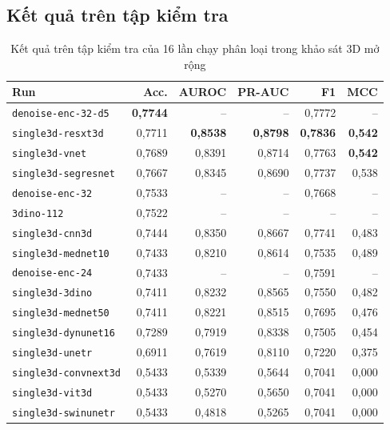 \documentclass[14pt,a4paper,oneside]{extreport}
\begin{document}
\clearpage
\subsection{Kết quả trên tập kiểm tra}
\begin{table}[!htbp]
  \centering
  \caption{Kết quả trên tập kiểm tra của 16 lần chạy phân loại trong khảo sát 3D mở rộng}
  \label{tab:sweep-3d-all-test}
  \setlength{\tabcolsep}{3pt}
  \begin{tabular}{@{}lrrrrr@{}}
    \toprule Run & Acc. & AUROC & PR-AUC & F1 & MCC\\ \midrule
    \texttt{denoise-enc-32-d5} & \textbf{0,7744} & -- & -- & 0,7772 & --\\
    \texttt{single3d-resxt3d} & 0,7711 & \textbf{0,8538} & \textbf{0,8798} & \textbf{0,7836} & \textbf{0,542}\\
    \texttt{single3d-vnet} & 0,7689 & 0,8391 & 0,8714 & 0,7763 & \textbf{0,542}\\
    \texttt{single3d-segresnet} & 0,7667 & 0,8345 & 0,8690 & 0,7737 & 0,538\\
    \texttt{denoise-enc-32} & 0,7533 & -- & -- & 0,7668 & --\\
    \texttt{3dino-112} & 0,7522 & -- & -- & -- & --\\
    \texttt{single3d-cnn3d} & 0,7444 & 0,8350 & 0,8667 & 0,7741 & 0,483\\
    \texttt{single3d-mednet10} & 0,7433 & 0,8210 & 0,8614 & 0,7535 & 0,489\\
    \texttt{denoise-enc-24} & 0,7433 & -- & -- & 0,7591 & --\\
    \texttt{single3d-3dino} & 0,7411 & 0,8232 & 0,8565 & 0,7550 & 0,482\\
    \texttt{single3d-mednet50} & 0,7411 & 0,8221 & 0,8515 & 0,7695 & 0,476\\
    \texttt{single3d-dynunet16} & 0,7289 & 0,7919 & 0,8338 & 0,7505 & 0,454\\
    \texttt{single3d-unetr} & 0,6911 & 0,7619 & 0,8110 & 0,7220 & 0,375\\
    \texttt{single3d-convnext3d} & 0,5433 & 0,5339 & 0,5644 & 0,7041 & 0,000\\
    \texttt{single3d-vit3d} & 0,5433 & 0,5270 & 0,5650 & 0,7041 & 0,000\\
    \texttt{single3d-swinunetr} & 0,5433 & 0,4818 & 0,5265 & 0,7041 & 0,000\\
    \bottomrule
  \end{tabular}
  \par{}
\end{table}
\end{document}
